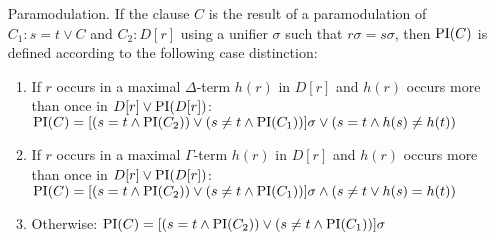 \begin{defi}
\begin{itemize}
	\item[Paramodulation.]
		If the clause $C$ is the result of a paramodulation of $C_1: s=t \lor C$ and $C_2: D[r]$ using a unifier $\sigma$ such that $r\sigma = s\sigma$, then $\operatorname{PI}(C)$ is defined according to the following case distinction:
		\begin{enumerate}
			\item If $r$ occurs in a maximal $\Delta$-term $h(r)$ in $D[r]$ and $h(r)$ occurs more than once in $D[r] \lor \operatorname{PI}(D[r])$:
				\label{def:PI_paramod_1}
				\newline
				$\operatorname{PI}(C) = [ ( s=t \land \operatorname{PI}(C_2) ) \lor (s\neq t \land \operatorname{PI}(C_1)) ]\sigma \lor (s=t \land h(s) \neq h(t))$ 
			\item If $r$ occurs in a maximal $\Gamma$-term $h(r)$ in $D[r]$ and $h(r)$ occurs more than once in $D[r] \lor \operatorname{PI}(D[r])$:
				\label{def:PI_paramod_2}
				\newline
				$\operatorname{PI}(C) = [ ( s=t \land \operatorname{PI}(C_2) ) \lor (s\neq t \land \operatorname{PI}(C_1)) ]\sigma \land (s\neq t \lor h(s) = h(t))$ 
			\item Otherwise:
				\label{def:PI_paramod_3}
				\newline
				$\operatorname{PI}(C) = [ ( s=t \land \operatorname{PI}(C_2) ) \lor (s\neq t \land \operatorname{PI}(C_1)) ]\sigma$ \qedhere

		\end{enumerate}
\end{itemize}
\end{defi}


